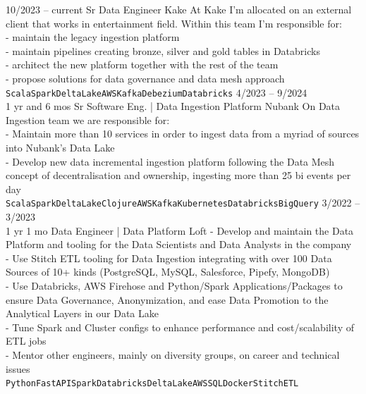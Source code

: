 \documentclass[9pt]{developercv} %
\begin{document}
\begin{entrylist}
	\entry
		{10/2023 -- current}
		{Sr Data Engineer}
		{Kake}
		{ At Kake I'm allocated on an external client that works in entertainment field. Within this team I'm responsible for:\\
  - maintain the legacy ingestion platform \\
  - maintain pipelines creating bronze, silver and gold tables in Databricks\\
  - architect the new platform together with the rest of the team\\
  - propose solutions for data governance and data mesh approach
\\\texttt{Scala}\slashsep\texttt{Spark}\slashsep\texttt{DeltaLake}\slashsep\texttt{AWS}\slashsep\texttt{Kafka}\slashsep\texttt{Debezium}\slashsep\texttt{Databricks}}
	\entry
		{4/2023 -- 9/2024 \\\footnotesize{1 yr and 6 mos}}
		{Sr Software Eng. | Data Ingestion Platform}
		{Nubank}
		{
On Data Ingestion team we are responsible for:
\\ - Maintain more than 10 services in order to ingest data from a myriad of sources into Nubank's Data Lake
\\- Develop new data incremental ingestion platform following the Data Mesh concept of decentralisation and ownership, ingesting more than 25 bi events per day
\\\texttt{Scala}\slashsep\texttt{Spark}\slashsep\texttt{DeltaLake}\slashsep\texttt{Clojure}\slashsep\texttt{AWS}\slashsep\texttt{Kafka}\slashsep\texttt{Kubernetes}\slashsep\texttt{Databricks}\slashsep\texttt{BigQuery}}
	\entry
		{3/2022 -- 3/2023 \\\footnotesize{1 yr 1 mo}}
		{Data Engineer | Data Platform}
		{Loft}
		{- Develop and maintain the Data Platform and tooling for the Data Scientists and Data Analysts in the company
\\- Use Stitch ETL tooling for Data Ingestion integrating with over 100 Data Sources of 10+ kinds (PostgreSQL, MySQL, Salesforce, Pipefy, MongoDB)
\\- Use Databricks, AWS Firehose and Python/Spark Applications/Packages to ensure Data Governance, Anonymization, and ease Data Promotion to the Analytical Layers in our Data Lake
\\- Tune Spark and Cluster configs to enhance performance and cost/scalability of ETL jobs
\\- Mentor other engineers, mainly on diversity groups, on career and technical issues \\ \texttt{Python}\slashsep\texttt{FastAPI}\slashsep\texttt{Spark}\slashsep\texttt{Databricks}\slashsep\texttt{DeltaLake}\slashsep\texttt{AWS}\slashsep\texttt{SQL}\slashsep\texttt{Docker}\slashsep\texttt{StitchETL}}

\end{entrylist}
\end{document}
